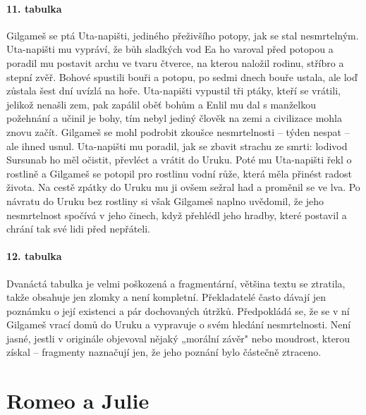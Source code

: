 \documentclass[12pt, a4paper]{article}
\begin{document}
\paragraph{11. tabulka}
Gilgameš se ptá Uta-napišti, jediného přeživšího potopy, jak se stal nesmrtelným. Uta-napišti mu vypráví, že bůh sladkých vod Ea ho varoval před potopou a poradil mu postavit archu ve tvaru čtverce, na kterou naložil rodinu, stříbro a stepní zvěř. Bohové spustili bouři a potopu, po sedmi dnech bouře ustala, ale loď zůstala šest dní uvízlá na hoře. Uta-napišti vypustil tři ptáky, kteří se vrátili, jelikož nenašli zem, pak zapálil oběť bohům a Enlil mu dal s manželkou požehnání a učinil je bohy, tím nebyl jediný člověk na zemi a civilizace mohla znovu začít. Gilgameš se mohl podrobit zkoušce nesmrtelnosti -- týden nespat -- ale ihned usnul. Uta-napišti mu poradil, jak se zbavit strachu ze smrti: lodivod Sursunab ho měl očistit, převléct a vrátit do Uruku. Poté mu Uta-napišti řekl o rostlině a Gilgameš se potopil pro rostlinu vodní růže, která měla přinést radost života. Na cestě zpátky do Uruku mu ji ovšem sežral had a proměnil se ve lva. Po návratu do Uruku bez rostliny si však Gilgameš naplno uvědomil, že jeho nesmrtelnost spočívá v jeho činech, když přehlédl jeho hradby, které postavil a chrání tak své lidi před nepřáteli.

\paragraph{12. tabulka}
Dvanáctá tabulka je velmi poškozená a fragmentární, většina textu se ztratila, takže obsahuje jen zlomky a není kompletní. Překladatelé často dávají jen poznámku o její existenci a pár dochovaných útržků. Předpokládá se, že se v ní Gilgameš vrací domů do Uruku a vypravuje o svém hledání nesmrtelnosti. Není jasné, jestli v originále objevoval nějaký „morální závěr" nebo moudrost, kterou získal -- fragmenty naznačují jen, že jeho poznání bylo částečně ztraceno.
\newpage

\section{Romeo a Julie}
\end{document}
